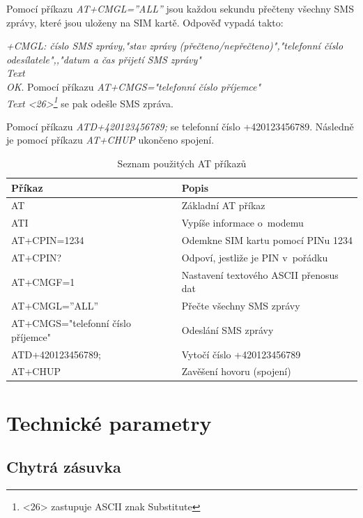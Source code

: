 \documentclass[12pt,a4paper,oneside]{article}
\begin{document}
Pomocí příkazu \textit{AT+CMGL=”ALL”} jsou každou sekundu přečteny všechny SMS zprávy, které jsou uloženy na SIM kartě. Odpověď vypadá takto:

\textit{+CMGL: číslo SMS zprávy,"stav zprávy (přečteno/nepřečteno)","telefonní číslo odesílatele",,"datum a čas přijetí SMS zprávy" \\ Text \\ OK}.
Pomocí příkazu \textit{AT+CMGS="telefonní číslo příjemce" \\ Text <26>\footnote{<26> zastupuje ASCII znak Substitute}} se pak odešle SMS zpráva.

Pomocí příkazu \textit{ATD+420123456789;} se  telefonní číslo +420123456789. Následně je pomocí příkazu \textit{AT+CHUP} ukončeno spojení.

\begin{table}[H]
  \centering
  \begin{tabular}{|l|l|}
    \hline
    \textbf{Příkaz} & \textbf{Popis} \\
    \hline
    \hline
    AT & Základní AT příkaz \\
    \hline
    ATI & Vypíše informace o~modemu \\
    \hline
    AT+CPIN=1234 & Odemkne SIM kartu pomocí PINu 1234 \\
    \hline
    AT+CPIN? & Odpoví, jestliže je PIN v~pořádku \\
    \hline
    AT+CMGF=1 & Nastavení textového ASCII přenosus dat \\
    \hline
    AT+CMGL=”ALL” & Přečte všechny SMS zprávy \\
    \hline
    AT+CMGS="telefonní číslo příjemce" & Odeslání SMS zprávy \\
    \hline
    ATD+420123456789; & Vytočí číslo +420123456789 \\
    \hline
    AT+CHUP & Zavěšení hovoru (spojení) \\
    \hline
  \end{tabular}
  \caption{Seznam použitých AT příkazů}\label{table:at-prikazy}
\end{table}

\newpage

\section{Technické parametry}

\subsection{Chytrá zásuvka}
\end{document}
